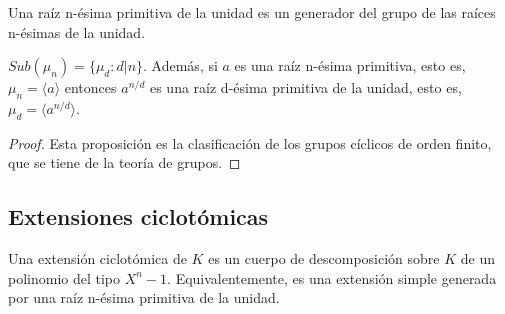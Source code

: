 \begin{definition}
Una raíz n-ésima primitiva de la unidad es un generador del grupo de las raíces n-ésimas de la unidad. 
\end{definition}

\begin{proposition}
$Sub(\mu_n) = \{\mu_d:d | n \}$. Además, si $a$ es una raíz n-ésima primitiva, esto es, $\mu_n = \langle a \rangle$ entonces $a^{n/d}$ es una raíz d-ésima primitiva de la unidad, esto es, $\mu_d = \langle a^{n/d} \rangle$. 
\end{proposition}
\begin{proof}
Esta proposición es la clasificación de los grupos cíclicos de orden finito, que se tiene de la teoría de grupos. 
\end{proof}

\subsection{Extensiones ciclotómicas}

\begin{definition}
Una extensión ciclotómica de $K$ es un cuerpo de descomposición sobre $K$ de un polinomio del tipo $X^n-1$. Equivalentemente, es una extensión simple generada por una raíz n-ésima primitiva de la unidad. 
\end{definition}

